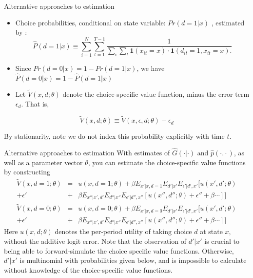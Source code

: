 \begin{frame}{Alternative approaches to estimation}
\begin{itemize}
\item Choice probabilities, conditional on state variable: $Pr(d = 1 | x)$  , estimated by :
\begin{equation*}
\hat P (d = 1| x) \equiv \sum^N_{i=1} \sum^{T-1}_{t=1} \frac{1}{\sum_i \sum_t \symbf{1} (x_{it} = x ) \cdot \symbf{1} (d_{it} =1, x_{it} = x).}
\end{equation*}
\item  Since  $Pr(d = 0 | x) = 1 - Pr(d=1 |x)$, we have $\hat{P} (d = 0 | x) = 1 - \hat{P}(d = 1|x)$
\item Let $\tilde V (x, d ; \theta)$ denote the choice-specific value function, minus the error term $\epsilon_d$. That is,
\end{itemize}
\begin{equation*}
\tilde V (x, d; \theta) \equiv \tilde V (x, \epsilon, d; \theta) - \epsilon_d
\end{equation*}
\begin{reference}{4mm}{90mm}
By stationarity, note we do not index this probability explicitly with time $t$.
\end{reference}
\end{frame}


\begin{frame}{Alternative approaches to estimation}
With estimates of $\hat G (\cdot | \cdot)$ and $\hat p (\cdot .  \cdot)$, as well as a parameter vector $\theta$, you can \alert{estimate} the choice-specific value functions by constructing  
\begin{eqnarray*}
\tilde V(x, d =1 ;\theta) &= & u(x, d=1; \theta) + \beta E_{x'|x, d=1} E_{d'|x'} E_{\epsilon '| d', x'} [ u(x', d' ;\theta)\\ 
+ \epsilon' &+&  \beta E_{x''|x', d'} E_{d''|x''} E_{\epsilon'|d'', x''} [ u(x'', d'';\theta) + \epsilon'' + \beta \cdots ] ] \\
\tilde V(x, d =0 ;\theta) &= & u(x, d=0; \theta) + \beta E_{x'|x, d=0} E_{d'|x'} E_{\epsilon '| d', x'} [ u(x', d' ;\theta)  \\
+ \epsilon' &+& \beta E_{x''|x', d'} E_{d''|x''} E_{\epsilon'|d'', x''} [ u(x'', d'';\theta) + \epsilon'' + \beta \cdots ] ]
\end{eqnarray*}
Here $u(x, d;\theta)$ denotes the per-period utility of taking choice $d$ at state $x$, \alert{without} the additive logit error. Note that the observation of $d'|x'$ is crucial to being able to forward-simulate the \alert{choice specific value functions}. Otherwise, $d'|x'$ is multinomial with probabilities given below, and is impossible to calculate without knowledge of the choice-specific value functions. 
\end{frame}


